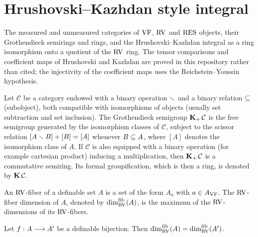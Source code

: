 \section{Hrushovski--Kazhdan style integral}
\label{section-3}
The measured and unmeasured categories of $\mathrm{VF}$, $\mathrm{RV}$ and $\mathrm{RES}$ objects, their Grothendieck semirings and rings, and the Hrushovski--Kazhdan integral as a ring isomorphism onto a quotient of the $\mathrm{RV}$ ring. The tensor comparisons and coefficient maps of Hrushovski and Kazhdan are proved in this repository rather than cited; the injectivity of the coefficient maps uses the Reichstein--Youssin hypothesis.

\setcounter{theorem}{0}
\begin{definition}
\label{def-Kgroup}
\leanok
Let $\mathcal{C}$ be a category endowed with a binary operation $\smallsetminus$ and a binary relation $\subseteq$ (subobject), both compatible with isomorphisms of objects (usually set subtraction and set inclusion). The Grothendieck semigroup $\operatorname{\mathbf{K}_+} \mathcal{C}$ is the free semigroup generated by the isomorphism classes of $\mathcal{C}$, subject to the scissor relation $[A \smallsetminus B] + [B] = [A]$ whenever $B \subseteq A$, where $[A]$ denotes the isomorphism class of $A$. If $\mathcal{C}$ is also equipped with a binary operation (for example cartesian product) inducing a multiplication, then $\operatorname{\mathbf{K}_+} \mathcal{C}$ is a commutative semiring. Its formal groupification, which is then a ring, is denoted by $\operatorname{\mathbf{K}} \mathcal{C}$.
\end{definition}

\setcounter{theorem}{1}
\begin{definition}
\label{s3-rv-fiber-dimension}
\leanok
{}
An $\mathrm{RV}$-fiber of a definable set $A$ is a set of the form $A_a$ with $a \in A_{\mathrm{VF}}$. The $\mathrm{RV}$-fiber dimension of $A$, denoted by $\dim^{\mathrm{fib}}_{\mathrm{RV}}(A)$, is the maximum of the $\mathrm{RV}$-dimensions of its $\mathrm{RV}$-fibers.
\end{definition}

\setcounter{theorem}{2}
\begin{lemma}
\label{RV-fiber-dim-same}
\leanok
{}
Let $f : A \longrightarrow A'$ be a definable bijection. Then $\dim^{\mathrm{fib}}_{\mathrm{RV}}(A) = \dim^{\mathrm{fib}}_{\mathrm{RV}}(A')$.
\end{lemma}

